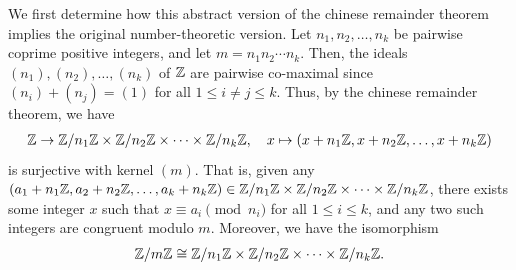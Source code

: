 We first determine how this abstract version of the chinese remainder theorem implies the original number-theoretic version. Let $n_{1}, n_{2}, \ldots, n_{k}$ be pairwise coprime positive integers, and let $m = n_{1} n_{2} \cdots n_{k}$. Then, the ideals $(n_{1}), (n_{2}), \ldots, (n_{k})$ of $\mathbb{Z}$ are pairwise co-maximal since $(n_{i}) + (n_{j}) = (1)$ for all $1 \leq i \neq j \leq k$. Thus, by the chinese remainder theorem, we have
\begin{align}
    \mathbb{Z} \to \mathbb{Z}/n_{1}\mathbb{Z} \times \mathbb{Z}/n_{2}\mathbb{Z} \times \cdots \times \mathbb{Z}/n_{k}\mathbb{Z}, \quad x \mapsto (x + n_{1}\mathbb{Z}, x + n_{2}\mathbb{Z}, \ldots, x + n_{k}\mathbb{Z})
\end{align}
is surjective with kernel $(m)$. That is, given any $(a_{1} + n_{1}\mathbb{Z}, a_{2} + n_{2}\mathbb{Z}, \ldots, a_{k} + n_{k}\mathbb{Z}) \in \mathbb{Z}/n_{1}\mathbb{Z} \times \mathbb{Z}/n_{2}\mathbb{Z} \times \cdots \times \mathbb{Z}/n_{k}\mathbb{Z}$, there exists some integer $x$ such that $x \equiv a_{i} \pmod{n_{i}}$ for all $1 \leq i \leq k$, and any two such integers are congruent modulo $m$. Moreover, we have the isomorphism
\begin{align}
    \mathbb{Z}/m\mathbb{Z} \cong \mathbb{Z}/n_{1}\mathbb{Z} \times \mathbb{Z}/n_{2}\mathbb{Z} \times \cdots \times \mathbb{Z}/n_{k}\mathbb{Z}.
\end{align}

